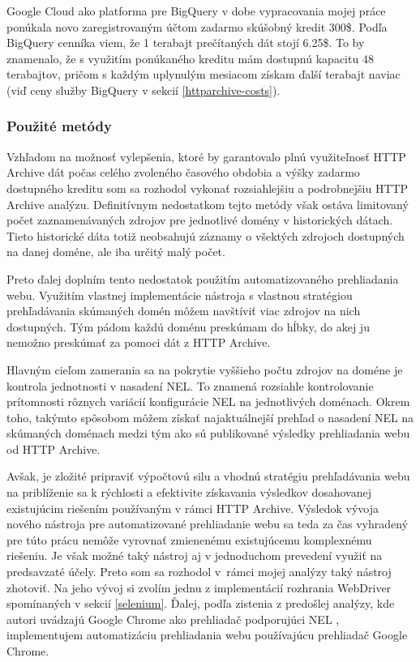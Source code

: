 Google Cloud ako platforma pre BigQuery v dobe vypracovania mojej práce ponúkala novo zaregistrovaným účtom zadarmo skúšobný
kredit 300\$. 
Podľa BigQuery cenníka viem, že 1 terabajt prečítaných dát stojí 6.25\$.
To by znamenalo, že s využitím ponúkaného kreditu mám dostupnú kapacitu 48 terabajtov, 
pričom s každým uplynulým mesiacom získam ďalší terabajt naviac (viď ceny služby BigQuery v sekcií \ref{httparchive-costs}).

\subsubsection{Použité metódy}

Vzhľadom na možnosť vylepšenia, ktoré by garantovalo plnú využiteľnosť HTTP Archive dát počas celého zvoleného časového obdobia a výšky zadarmo dostupného kreditu
som sa rozhodol vykonať rozsiahlejšiu a podrobnejšiu HTTP Archive analýzu.
Definitívnym nedostatkom tejto metódy však ostáva limitovaný počet zaznamenávaných zdrojov pre jednotlivé domény v historických dátach.
Tieto historické dáta totiž neobsahujú záznamy o všektých zdrojoch dostupných na danej doméne, ale iba určitý malý počet.

Preto ďalej doplním tento nedostatok použitím automatizovaného prehliadania webu.
Využitím vlastnej implementácie nástroja s vlastnou stratégiou prehľadávania skúmaných domén môžem navštíviť viac zdrojov na nich dostupných. 
Tým pádom každú doménu preskúmam do hĺbky, do akej ju nemožno preskúmať za pomoci dát z HTTP Archive. 

Hlavným cieľom zamerania sa na pokrytie vyššieho počtu zdrojov na doméne je kontrola jednotnosti v nasadení NEL.
To znamená rozsiahle kontrolovanie prítomnosti rôznych variácií konfigurácie NEL na jednotlivých doménach.
Okrem toho, takýmto spôsobom môžem získať najaktuálnejší prehľad o nasadení NEL na skúmaných doménach medzi tým ako sú publikované výsledky prehliadania webu od HTTP Archive.

Avšak, je zložité pripraviť výpočtovú silu a vhodnú stratégiu prehľadávania webu na priblíženie sa k rýchlosti a efektivite získavania výsledkov dosahovanej existujúcim riešením používaným v rámci HTTP Archive.
Výsledok vývoja nového nástroja pre automatizované prehliadanie webu sa teda za čas vyhradený pre túto prácu nemôže vyrovnať zmienenému existujúcemu komplexnému riešeniu.
Je však možné taký nástroj aj v jednoduchom prevedení využiť na predsavzaté účely.
Preto som sa rozhodol \mbox{v rámci} mojej analýzy taký nástroj zhotoviť.
Na jeho vývoj si zvolím jednu z implementácií rozhrania WebDriver spomínaných v sekcií \ref{selenium}.
Ďalej, podľa zistenia z predošlej analýzy, kde autori uvádzajú Google Chrome ako prehliadač podporujúci NEL \cite{nel-http-archive}, implementujem automatizáciu prehliadania webu používajúcu prehliadač Google Chrome.

